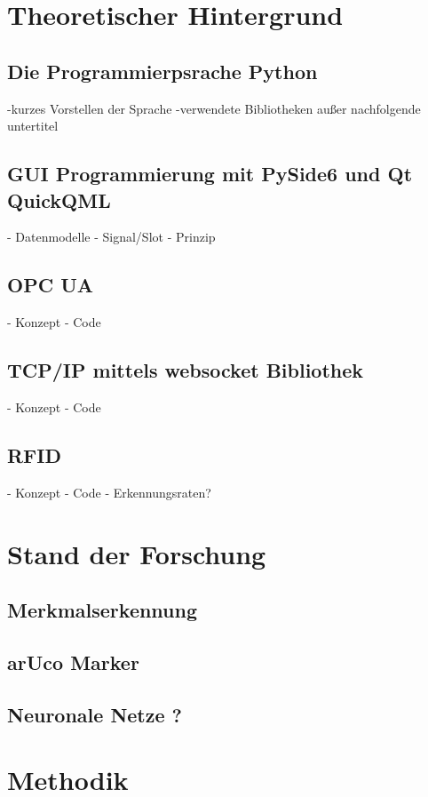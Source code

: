 \documentclass[11pt]{scrartcl}
\begin{document}
    \newpage
    \section{Theoretischer Hintergrund}

    \subsection{Die Programmierpsrache Python}
    -kurzes Vorstellen der Sprache
    -verwendete Bibliotheken außer nachfolgende untertitel

    \subsection{GUI Programmierung mit PySide6 und Qt QuickQML}
    - Datenmodelle
    - Signal/Slot - Prinzip

    \subsection{OPC UA}
    - Konzept
    - Code

    \subsection{TCP/IP mittels websocket Bibliothek}
    - Konzept
    - Code

    \subsection{RFID}
    - Konzept
    - Code
    - Erkennungsraten?

    \newpage
    \section{Stand der Forschung}
    \subsection{Merkmalserkennung}
    \subsection{arUco Marker}
    \subsection{Neuronale Netze ? }

    \newpage
    \section{Methodik}
\end{document}
